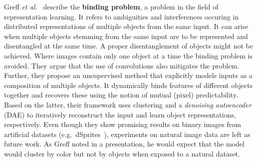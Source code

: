 \documentclass[a4paper,12pt]{report}
\begin{document}
\par Greff \textit{et al.\ }\cite{BindingRC} describe the \textbf{binding problem}, a problem in the field of representation learning. It refers to ambiguities and interferences occuring in distributed representations of multiple objects from the same input. It can arise when multiple objects stemming from the same input are to be represented and disentangled at the same time. A proper disentanglement of objects might not be achieved. Where images contain only one object at a time the binding problem is avoided. They argue that the use of convolutions also mitigates the problem. Further, they propose an unsupervised method that explicitly models inputs as a composition of multiple objects. It dynamically binds features of different objects together and recovers these using the notion of mutual (pixel) predictability. Based on the latter, their framework uses clustering and a \emph{denoising autoencoder} (DAE) to iteratively reconstruct the input and learn object representations, respectively. Even though they show promising results on binary images from artificial datasets (e.g.\ dSprites~\cite{dSprites}), experiments on natural image data are left as future work. As Greff noted in a presentation, he would expect that the model would cluster by color but not by objects when exposed to a natural dataset. 


\end{document}

